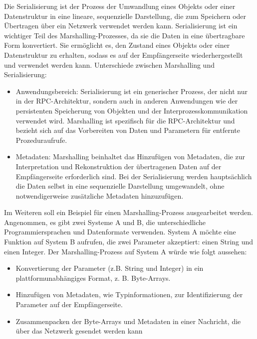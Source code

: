 \documentclass[../vs-script-first-v01.tex]{subfiles}
\begin{document}
Die Serialisierung ist der Prozess der Umwandlung eines Objekts oder einer Datenstruktur in eine lineare, sequenzielle Darstellung, die zum Speichern oder Übertragen über ein Netzwerk verwendet werden kann. Serialisierung ist ein wichtiger Teil des Marshalling-Prozesses, da sie die Daten in eine übertragbare Form konvertiert. Sie ermöglicht es, den Zustand eines Objekts oder einer Datenstruktur zu erhalten, sodass es auf der Empfängerseite wiederhergestellt und verwendet werden kann. Unterschiede zwischen Marshalling und Serialisierung:
\begin{itemize} 
\item Anwendungsbereich: Serialisierung ist ein generischer Prozess, der nicht nur in der RPC-Architektur, sondern auch in anderen Anwendungen wie der persistenten Speicherung von Objekten und der Interprozesskommunikation verwendet wird. Marshalling ist spezifisch für die RPC-Architektur und bezieht sich auf das Vorbereiten von Daten und Parametern für entfernte Prozeduraufrufe.
\item Metadaten: Marshalling beinhaltet das Hinzufügen von Metadaten, die zur Interpretation und Rekonstruktion der übertragenen Daten auf der Empfängerseite erforderlich sind. Bei der Serialisierung werden hauptsächlich die Daten selbst in eine sequenzielle Darstellung umgewandelt, ohne notwendigerweise zusätzliche Metadaten hinzuzufügen.
\end{itemize} 
Im Weiteren soll ein Beispiel für einen Marshalling-Prozess ausgearbeitet werden. Angenommen, es gibt zwei Systeme A und B, die unterschiedliche Programmiersprachen und Datenformate verwenden. System A möchte eine Funktion auf System B aufrufen, die zwei Parameter akzeptiert: einen String und einen Integer. Der Marshalling-Prozess auf System A würde wie folgt aussehen:
\begin{itemize} 
\item Konvertierung der Parameter (z.B. String und Integer) in ein plattformunabhängiges Format, z. B. Byte-Arrays.
\item Hinzufügen von Metadaten, wie Typinformationen, zur Identifizierung der Parameter auf der Empfängerseite.
\item Zusammenpacken der Byte-Arrays und Metadaten in einer Nachricht, die über das Netzwerk gesendet werden kann
\end{itemize} 
\end{document}
